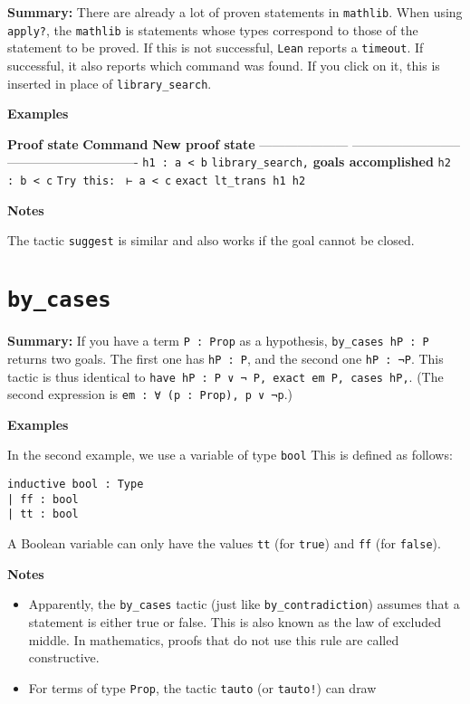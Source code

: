 \documentclass{memoir}
\begin{document}
\textbf{Summary:} There are already a lot of proven statements in \Verb|mathlib|. When using \Verb|apply?|, the \Verb|mathlib| is statements whose types correspond to those of the statement to be proved. If this is not successful, \Verb|Lean| reports a \Verb|timeout|. If successful, it also reports which command was found. If you click on it, this is inserted in place of \Verb|library_search|.

\textbf{Examples}

\textbf{Proof state} \textbf{Command} \textbf{New proof state}
--------------------- -------------------------- -------------------------------
\Verb|h1 : a < b| \Verb|library_search,| \textbf{goals accomplished}
\Verb|h2 : b < c| \Verb|Try this: |
\Verb|⊢ a < c| \Verb|exact lt_trans h1 h2|

\textbf{Notes}

The tactic \Verb|suggest| is similar and also works if
the goal cannot be closed.




\section{\Verb|by_cases|}

\textbf{Summary:}
If you have a term \Verb|P : Prop| as a hypothesis, \Verb|by_cases hP : P| returns two goals. The first one has \Verb|hP : P|, and the second one \Verb|hP : ¬P|. This tactic is thus identical to \Verb|have hP : P ∨ ¬ P, exact em P, cases hP,|. (The second expression is \Verb|em : ∀ (p : Prop), p ∨ ¬p|.)

\textbf{Examples}

In the second example, we use a variable of type \Verb|bool| This is defined as follows:

\begin{verbatim}
inductive bool : Type
| ff : bool
| tt : bool

\end{verbatim}


A Boolean variable can only have the values \Verb|tt| (for \Verb|true|) and \Verb|ff| (for \Verb|false|).

\textbf{Notes}

\begin{itemize}
\item Apparently, the \Verb|by_cases| tactic (just like \Verb|by_contradiction|) assumes that a statement is either true or false. This is also known as the law of excluded middle. In mathematics, proofs that do not use this rule are called constructive.\item For terms of type \Verb|Prop|, the tactic \Verb|tauto| (or \Verb|tauto!|) can
draw

\end{itemize}
\end{document}
